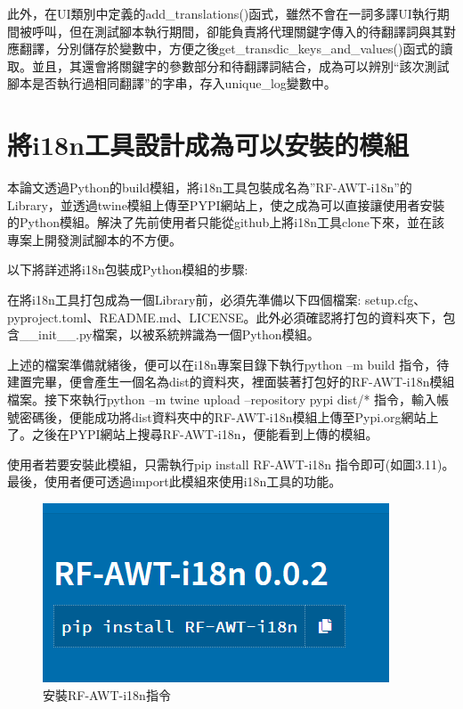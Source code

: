 此外，在UI類別中定義的add\_translations()函式，雖然不會在一詞多譯UI執行期間被呼叫，但在測試腳本執行期間，卻能負責將代理關鍵字傳入的待翻譯詞與其對應翻譯，分別儲存於變數中，方便之後get\_transdic\_keys\_and\_values()函式的讀取。並且，其還會將關鍵字的參數部分和待翻譯詞結合，成為可以辨別“該次測試腳本是否執行過相同翻譯”的字串，存入unique\_log變數中。

\section{將i18n工具設計成為可以安裝的模組}
本論文透過Python的build模組，將i18n工具包裝成名為”RF-AWT-i18n”的Library，並透過twine模組上傳至PYPI\cite{PYPI}網站上，使之成為可以直接讓使用者安裝的Python模組。解決了先前使用者只能從github上將i18n工具clone下來，並在該專案上開發測試腳本的不方便。

以下將詳述將i18n包裝成Python模組的步驟:

在將i18n工具打包成為一個Library前，必須先準備以下四個檔案: setup.cfg、pyproject.toml、README.md、LICENSE\cite{license}。此外必須確認將打包的資料夾下，包含\_\_init\_\_.py檔案，以被系統辨識為一個Python模組。

上述的檔案準備就緒後，便可以在i18n專案目錄下執行python –m build 指令，待建置完畢，便會產生一個名為dist的資料夾，裡面裝著打包好的RF-AWT-i18n模組檔案。接下來執行python –m twine upload –repository pypi dist/* 指令，輸入帳號密碼後，便能成功將dist資料夾中的RF-AWT-i18n模組上傳至Pypi.org網站上了。之後在PYPI網站上搜尋RF-AWT-i18n，便能看到上傳的模組。

使用者若要安裝此模組，只需執行pip install RF-AWT-i18n 指令即可(如圖3.11)。最後，使用者便可透過import此模組來使用i18n工具的功能。

\begin{figure}[H]
    \centering
    \includegraphics[width= .7\textwidth]{../論文截圖/3-5-8 安裝RF-AWT-i18n指令.png}
    \caption{安裝RF-AWT-i18n指令}
\end{figure}